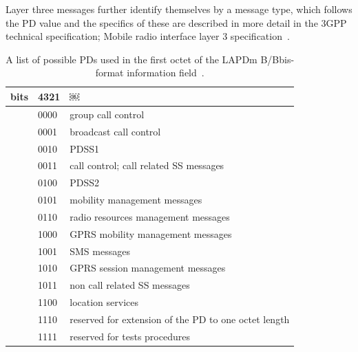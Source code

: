 Layer three messages further identify themselves by a message type,
which follows the \gls{PD} value and the specifics of these are
described in more detail in the 3GPP technical specification; Mobile
radio interface layer 3 specification~\cite{layer32}.
\begin{table}
  \centering
  \begin{tabular}{|ll|l|}
    \hline
    bits & 4321 &￼\\
    \hline
         & 0000 & group call control\\
    \hline
         & 0001 & broadcast call control\\
    \hline
         & 0010 & \gls{PDS}S1\\
    \hline
         & 0011 & call control; call related \gls{SS} messages\\
    \hline
         & 0100 & \gls{PDS}S2\\
    \hline
         & 0101 & mobility management messages\\
    \hline
         & 0110 & radio resources management messages\\
    \hline
         & 1000 & \gls{GPRS} mobility management messages\\
    \hline
         & 1001 & \gls{SMS} messages\\
    \hline
         & 1010 & \gls{GPRS} session management messages\\
    \hline
         & 1011 & non call related \gls{SS} messages\\
    \hline
         & 1100 & location services\\
    \hline
         & 1110 & reserved for extension of the \gls{PD} to one octet
                  length\\
    \hline
         & 1111 & reserved for tests procedures\\
    \hline
  \end{tabular}
  \caption{A list of possible \glspl{PD} used in the first octet of
    the \gls{LAPDm} B/Bbis-format information
    field~\cite[p. 87]{layer3}.}
  \label{tab:protocol_discriminators}
\end{table}
